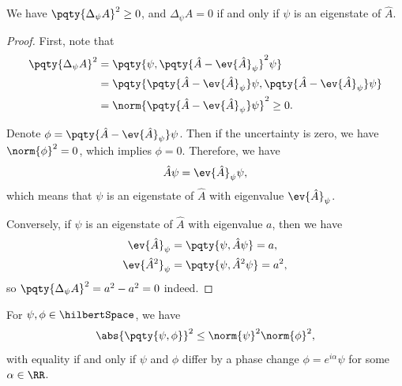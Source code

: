 \begin{lemma}
    We have \(\pqty{\Delta_\psi A}^2 \geq 0\), and \(\Delta_\psi A = 0\) if and only if \(\psi\) is an eigenstate of \(\hat{A}\).
\end{lemma}

\begin{proof}
    First, note that
    \begin{subequations}
        \begin{align}
            \pqty{\Delta_\psi A}^2 &= \pqty{\psi, \pqty{\hat{A} - \ev{\hat{A}}_\psi}^2 \psi} \\
            &= \pqty{\pqty{\hat{A} - \ev{\hat{A}}_\psi} \psi, \pqty{\hat{A} - \ev{\hat{A}}_\psi} \psi} \\
            &= \norm{\pqty{\hat{A} - \ev{\hat{A}}_\psi} \psi}^2 \geq 0.
        \end{align}
    \end{subequations}

    Denote \(\phi = \pqty{\hat{A} - \ev{\hat{A}}_\psi} \psi\). Then if the uncertainty is zero, we have \(\norm{\phi}^2 = 0\), which implies \(\phi = 0\). Therefore, we have
    \begin{equation}
        \hat{A} \psi = \ev{\hat{A}}_\psi \psi,
    \end{equation}
    which means that \(\psi\) is an eigenstate of \(\hat{A}\) with eigenvalue \(\ev{\hat{A}}_\psi\).
    
    Conversely, if \(\psi\) is an eigenstate of \(\hat{A}\) with eigenvalue \(a\), then we have
    \begin{subequations}
        \begin{align}
            \ev{\hat{A}}_{\psi} &= \pqty{\psi, \hat{A} \psi} = a, \\
            \ev{\hat{A}^2}_{\psi} &= \pqty{\psi, \hat{A}^2 \psi} = a^2,
        \end{align}
    \end{subequations}
    so \(\pqty{\Delta_\psi A}^2 = a^2 - a^2 = 0\) indeed.
\end{proof}

\begin{lemma}
    For \(\psi, \phi \in \hilbertSpace\), we have
    \begin{equation}
        \abs{\pqty{\psi, \phi}}^2 \leq \norm{\psi}^2 \norm{\phi}^2,
    \end{equation}
    with equality if and only if \(\psi\) and \(\phi\) differ by a phase change \(\phi = e^{i \alpha} \psi\) for some \(\alpha \in \RR\).
\end{lemma}

